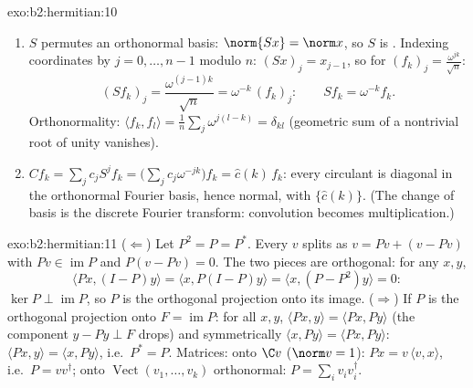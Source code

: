 \begin{solution}{exo:b2:hermitian:10}
\begin{enumerate}
  \item $S$ permutes an orthonormal basis: $\norm{Sx} = \norm
        x$, so $S$ is . Indexing coordinates by $j = 0,
        \dots, n-1$ modulo $n$: $(Sx)_j = x_{j-1}$, so for
        $(f_k)_j = \frac{\omega^{jk}}{\sqrt n}$:
        \[
        (Sf_k)_j = \frac{\omega^{(j-1)k}}{\sqrt n}
        = \omega^{-k}\,(f_k)_j :
        \qquad Sf_k = \omega^{-k}f_k .
        \]
        Orthonormality: $\langle f_k, f_l\rangle = \frac1n
        \sum_j \omega^{j(l-k)} = \delta_{kl}$ (geometric sum
        of a nontrivial root of unity vanishes).
  \item $Cf_k = \sum_j c_j S^jf_k = \bigl(\sum_j
        c_j\omega^{-jk}\bigr)f_k = \widehat c(k)\,f_k$: every
        circulant is diagonal in the orthonormal Fourier basis,
        hence normal, with  $\{\widehat c(k)\}$. (The
        change of basis is the discrete Fourier transform:
        convolution becomes multiplication.)
\end{enumerate}
\end{solution}

\begin{solution}{exo:b2:hermitian:11}
($\Leftarrow$) Let $P^2 = P = P^*$. Every $v$ splits as $v = Pv
+ (v - Pv)$ with $Pv \in \operatorname{im} P$ and $P(v - Pv) =
0$. The two pieces are orthogonal: for any $x, y$,
\[
\langle Px, (I - P)y\rangle = \langle x, P(I-P)y\rangle
= \langle x, (P - P^2)y\rangle = 0 :
\]
$\ker P \perp \operatorname{im} P$, so $P$ is the orthogonal
projection onto its image. ($\Rightarrow$) If $P$ is the
orthogonal projection onto $F = \operatorname{im}P$: for all
$x, y$, $\langle Px, y\rangle = \langle Px, Py\rangle$ (the
component $y - Py \perp F$ drops) and symmetrically $\langle
x, Py\rangle = \langle Px, Py\rangle$: $\langle Px, y\rangle =
\langle x, Py\rangle$, i.e.\ $P^* = P$. Matrices: onto $\C v$
($\norm v = 1$): $Px = v\,\langle v, x\rangle$, i.e.\ $P =
vv^\dagger$; onto $\operatorname{Vect}(v_1, \dots, v_k)$
orthonormal: $P = \sum_i v_iv_i^\dagger$.
\end{solution}

